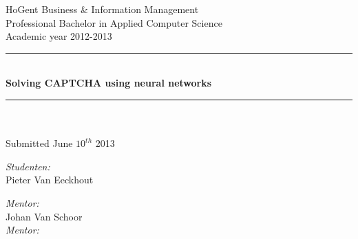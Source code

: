 \documentclass[pdftex,a4paper,12pt,twoside]{report}
\newcommand{\HRule}{\rule{\linewidth}{0.5mm}}
\newcommand{\emptypage}{
\newpage
\thispagestyle{empty}
\mbox{}
\newpage
}
\theoremstyle{plain} \newtheorem{theorem}{Theorem} \newtheorem{proposition}{Proposition} \newtheorem{lemma}{Lemma} \newtheorem*{corollary}{Corollary}
\theoremstyle{definition} \newtheorem{definition}{Definition} \newtheorem{conjecture}{Conjecture} \newtheorem*{example}{Example} \newtheorem{algorithm}{Algorithm}
\theoremstyle{remark} \newtheorem*{remark}{Remark} \newtheorem*{note}{Note} \newtheorem{case}{Case}
\newcommand{\captchasp}{CAPTCHA }
\newcommand{\studenta}{Pieter {Van Eeckhout}}
\newcommand{\begeleider}{Johan {Van Schoor}}
\newcommand{\titel}{Solving \captchasp using neural networks}
\newcommand{\ondertitel}{}
\newcommand{\datum}{June $10^{th}$ 2013}
\newcommand{\academiejaar}{2012-2013}
\begin{document}
\emptypage


\begin{titlepage}
\begin{center}
HoGent Business \& Information Management\\
Professional Bachelor in Applied Computer Science\\
Academic year \academiejaar

\vfill

\HRule \\[0.4cm]
{ \huge \bfseries \titel}\\[0.4cm]
\HRule \\[0.4cm]

{\Large \ondertitel}\\[0.4cm]

Submitted \datum

\vfill

\begin{minipage}{0.49\textwidth}
\begin{flushleft}
\emph{Student\ifdefined\studentb en\fi :}\\
\studenta \\
\ifdefined\studentb \studentb \fi\par
\end{flushleft}
\end{minipage}
\begin{minipage}{0.49\textwidth}
\begin{flushright}
\emph{Mentor:}\\ \begeleider\\
\ifdefined\mentor \emph{Mentor:}\\ \mentor \fi
\end{flushright}
\end{minipage}

\end{center}

\end{titlepage}


\emptypage


\tableofcontents



\begin{abstract}

\end{abstract}
\end{document}

